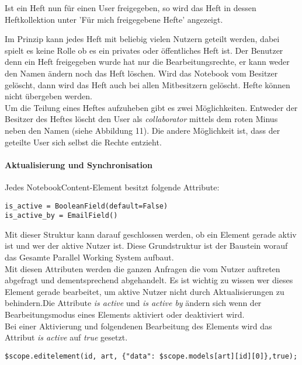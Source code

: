 Ist ein Heft nun für einen User freigegeben, so wird das Heft in dessen Heftkollektion unter 'Für mich freigegebene Hefte' angezeigt. \\


Im Prinzip kann jedes Heft mit beliebig vielen Nutzern geteilt werden, dabei spielt es keine Rolle ob es ein privates oder öffentliches Heft ist. 
Der Benutzer denn ein Heft freigegeben wurde hat nur die Bearbeitungsrechte, er kann weder den Namen ändern noch das Heft löschen. Wird das Notebook vom Besitzer gelöscht, dann wird das Heft auch bei allen Mitbesitzern gelöscht. Hefte können nicht übergeben werden.
\\
Um die Teilung eines Heftes aufzuheben gibt es zwei Möglichkeiten. Entweder der Besitzer des Heftes löscht den User als \textit{collaborator} mittels dem roten Minus neben den Namen (siehe Abbildung 11). Die andere Möglichkeit ist, dass der geteilte User sich selbst die Rechte entzieht.
\paragraph{Aktualisierung und Synchronisation}
Jedes NotebookContent-Element besitzt folgende Attribute:
\begin{lstlisting}[caption={Parallel Working System Attribute}]
is_active = BooleanField(default=False)
is_active_by = EmailField()
\end{lstlisting}
Mit dieser Struktur kann darauf geschlossen werden, ob ein Element gerade aktiv ist und wer der aktive Nutzer ist. Diese Grundstruktur ist der Baustein worauf das Gesamte Parallel Working System aufbaut.\\
Mit diesen Attributen werden die ganzen Anfragen die vom Nutzer auftreten abgefragt und dementsprechend abgehandelt. Es ist wichtig zu wissen wer dieses Element gerade bearbeitet, um aktive Nutzer nicht durch Aktualisierungen zu behindern.Die Attribute \textit{is active} und \textit{is active by} ändern sich wenn der Bearbeitungsmodus eines Elements aktiviert oder deaktiviert wird.\\

Bei einer Aktivierung und folgendenen Bearbeitung des Elements wird das Attribut \textit{is active} auf \textit{true} gesetzt.
\begin{lstlisting}[caption={Bearbeitungsmodus true - PWS}]
$scope.editelement(id, art, {"data": $scope.models[art][id][0]},true);
\end{lstlisting}

